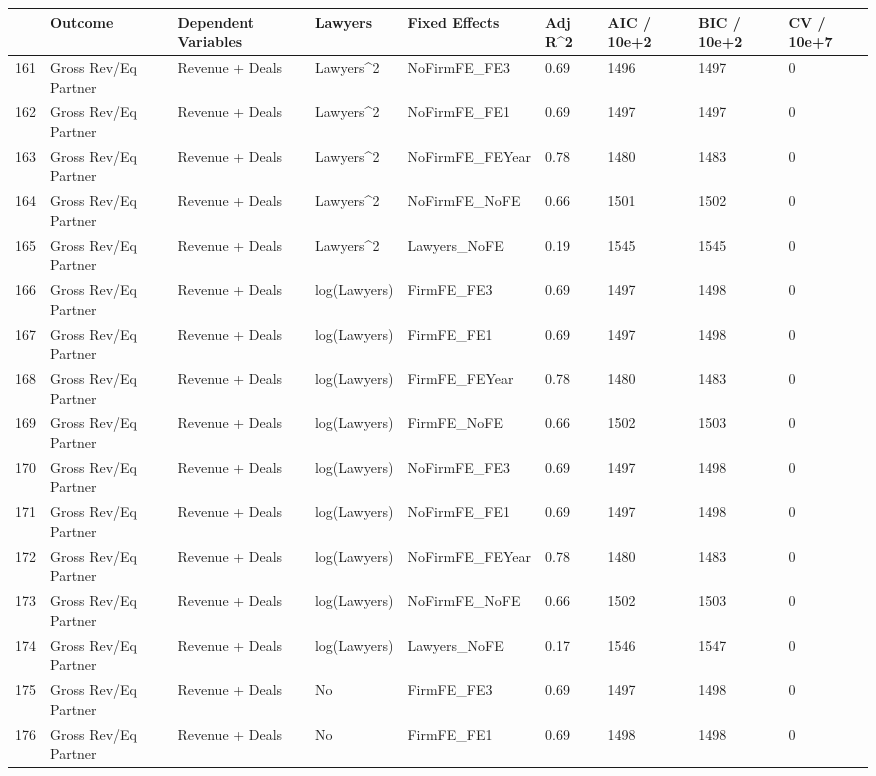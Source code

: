 \begin{table}[ht]
\centering
\begin{tabular}{rllllllll}
  \hline
 & Outcome & Dependent Variables & Lawyers & Fixed Effects & Adj R^2 & AIC / 10e+2 & BIC / 10e+2 & CV / 10e+7 \\ 
  \hline
161 & Gross Rev/Eq Partner & Revenue + Deals & Lawyers^2 & NoFirmFE\_FE3 & 0.69 & 1496 & 1497 & 0 \\ 
  162 & Gross Rev/Eq Partner & Revenue + Deals & Lawyers^2 & NoFirmFE\_FE1 & 0.69 & 1497 & 1497 & 0 \\ 
  163 & Gross Rev/Eq Partner & Revenue + Deals & Lawyers^2 & NoFirmFE\_FEYear & 0.78 & 1480 & 1483 & 0 \\ 
  164 & Gross Rev/Eq Partner & Revenue + Deals & Lawyers^2 & NoFirmFE\_NoFE & 0.66 & 1501 & 1502 & 0 \\ 
  165 & Gross Rev/Eq Partner & Revenue + Deals & Lawyers^2 & Lawyers\_NoFE & 0.19 & 1545 & 1545 & 0 \\ 
  166 & Gross Rev/Eq Partner & Revenue + Deals & log(Lawyers) & FirmFE\_FE3 & 0.69 & 1497 & 1498 & 0 \\ 
  167 & Gross Rev/Eq Partner & Revenue + Deals & log(Lawyers) & FirmFE\_FE1 & 0.69 & 1497 & 1498 & 0 \\ 
  168 & Gross Rev/Eq Partner & Revenue + Deals & log(Lawyers) & FirmFE\_FEYear & 0.78 & 1480 & 1483 & 0 \\ 
  169 & Gross Rev/Eq Partner & Revenue + Deals & log(Lawyers) & FirmFE\_NoFE & 0.66 & 1502 & 1503 & 0 \\ 
  170 & Gross Rev/Eq Partner & Revenue + Deals & log(Lawyers) & NoFirmFE\_FE3 & 0.69 & 1497 & 1498 & 0 \\ 
  171 & Gross Rev/Eq Partner & Revenue + Deals & log(Lawyers) & NoFirmFE\_FE1 & 0.69 & 1497 & 1498 & 0 \\ 
  172 & Gross Rev/Eq Partner & Revenue + Deals & log(Lawyers) & NoFirmFE\_FEYear & 0.78 & 1480 & 1483 & 0 \\ 
  173 & Gross Rev/Eq Partner & Revenue + Deals & log(Lawyers) & NoFirmFE\_NoFE & 0.66 & 1502 & 1503 & 0 \\ 
  174 & Gross Rev/Eq Partner & Revenue + Deals & log(Lawyers) & Lawyers\_NoFE & 0.17 & 1546 & 1547 & 0 \\ 
  175 & Gross Rev/Eq Partner & Revenue + Deals & No & FirmFE\_FE3 & 0.69 & 1497 & 1498 & 0 \\ 
  176 & Gross Rev/Eq Partner & Revenue + Deals & No & FirmFE\_FE1 & 0.69 & 1498 & 1498 & 0 \\ 

\end{tabular}
\end{table}
